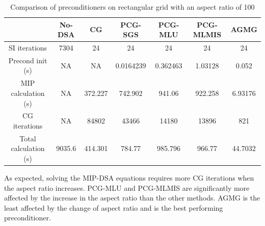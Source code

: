 \begin{table}[H]
  \caption{Comparison of preconditioners on rectangular grid with an aspect
  ratio of 100}
  \begin{center}
    \begin{tabular}{|c|c|c|c|c|c|c|}
      \hline
       & No-DSA & CG & PCG-SGS & PCG-MLU & PCG-MLMIS & AGMG \\
      \hline
      SI iterations & 7304    & 24      & 24        & 24       & 24      & 24 \\
   Precond init (s) & NA      & NA      & 0.0164239 & 0.362463 & 1.03128 & 0.052 \\
MIP calculation (s) & NA      & 372.227 & 742.902   & 941.06   & 922.258 &
      6.93176 \\
      CG iterations & NA      & 84802   & 43466     & 14180    & 13896   & 821 \\
Total calculation (s) & 9035.6 & 414.301 & 784.77   & 985.796  & 966.77  &
      44.7032 \\
      \hline
    \end{tabular}
    \label{table_ar_100}
  \end{center}
\end{table}                  
As expected, solving the MIP-DSA equations requires more CG iterations when the aspect
ratio increases. PCG-MLU and PCG-MLMIS are significantly more affected by the
increase in the aspect ratio than the other methods. AGMG is the least
affected by the change of aspect ratio and is the best performing
preconditioner.

